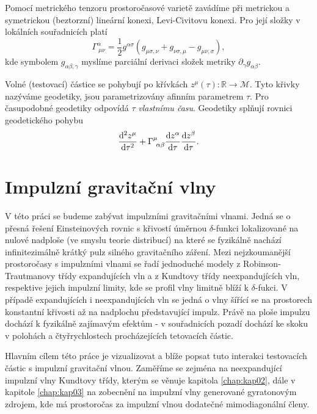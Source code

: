Pomocí metrického tenzoru prostoročasové varietě zavádíme při metrickou a symetrickou (beztorzní) lineární konexi, Levi-Civitovu konexi. Pro její složky v lokálních souřadnicích platí
\begin{equation}
    \Gamma^\alpha_{~\mu \nu} = \frac{1}{2} g^{\alpha \sigma} \left( g_{\mu \sigma,\nu} + g_{\nu \sigma, \mu} - g_{\mu \nu, \sigma}\right),
\end{equation}
kde symbolem $g_{\alpha \beta, \gamma}$ myslíme parciální derivaci složek metriky $\partial_\gamma g_{\alpha \beta}$.

Volné (testovací) částice se pohybují po křívkách $z^\mu(\tau): \mathbb{R} \to \mathcal{M}$. Tyto křivky nazýváme geodetiky, jsou parametrizovány afinním parametrem $\tau$. Pro časupodobné geodetiky
odpovídá $\tau$ \emph{vlastnímu času}. Geodetiky splňují rovnici geodetického pohybu
\begin{equation}
    \frac{\mathrm{d}^2 z^\mu}{\mathrm{d} \tau^2} + \Gamma^\mu_{~\alpha \beta} \frac{\mathrm{d} z^\alpha}{\mathrm{d} \tau} \frac{\mathrm{d} z^\beta}{\mathrm{d} \tau}.
\end{equation}


\section*{Impulzní gravitační vlny}
V této práci se budeme zabývat impulzními gravitačními vlnami. Jedná se o přesná řešení Einsteinových rovnic s křivostí úměrnou $\delta$-funkci lokalizované
na nulové nadploše (ve smyslu teorie distribucí) na které se fyzikálně nachází infinitezimálně krátký pulz silného gravitačního záření.
Mezi nejzkoumanější prostoročasy s impulzními vlnami se řadí jednoduché modely z Robinson-Trautmanovy třídy expandujících vln a z Kundtovy třídy
neexpandujících vln, respektive jejich impulzní limity, kde se profil vlny limitně blíží k $\delta$-fukci.
V případě expandujících i neexpandujících vln se jedná o vlny šířící se na prostorech konstantní křivosti až na nadplochu představující impulz.
Právě na ploše impulzu dochází k fyzikálně zajímavým efektům - v souřadnicích pozadí dochází ke skoku v polohách a čtyřrychlostech
procházejících tetovacích částic.

Hlavním cílem této práce je vizualizovat a blíže popsat tuto interakci testovacích částic s impulzní gravitační vlnou. Zaměříme se
zejména na neexpandující impulzní vlny Kundtovy třídy, kterým se věnuje kapitola \ref{chap:kap02}, dále v kapitole \ref{chap:kap03} na zobecnění na impulzní vlny generované
gyratonovým zdrojem, kde má prostoročas za impulzní vlnou dodatečné mimodiagonální členy.


